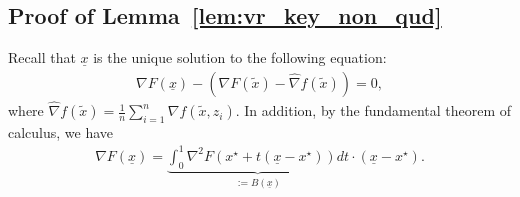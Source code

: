 \documentclass[11pt,twoside]{article}
\numberwithin{equation}{section}
\newcommand{\1}{\mathbf{1}}
\theoremstyle{remark}
\theoremstyle{plain}
\begin{document}
\subsection{Proof of Lemma~\ref{lem:vr_key_non_qud}} \label{appendix:vr_nonquadratic}
Recall that $\underline{x}$ is the unique solution to the following equation: \begin{align*}
	\nabla F(\underline x) - (\nabla F(\tilde x) - \widehat \nabla f(\tilde x)) = 0,
\end{align*}
where $\widehat \nabla f(\tilde x)  = \frac{1}{n} \sum_{i=1}^{n} \nabla f(\tilde x,z_i)$. 	In addition, by the fundamental theorem of calculus, we have
\begin{align*}
	\nabla F(\underline{x}) = \underbrace{\int_{0}^{1} \nabla^2 F(x^\star + t(\underline{x} - x^\star)) dt}_{:= B(\underline{x})} \cdot (\underline{x} - x^\star).
\end{align*} 
\end{document}
